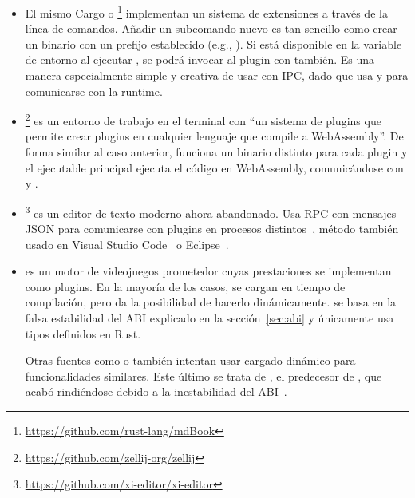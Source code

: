 \begin{itemize}
    \item El mismo Cargo o
        \footnote{\url{https://github.com/rust-lang/mdBook}}
        implementan un sistema de extensiones a través de la línea de comandos.
        Añadir un subcomando nuevo es tan sencillo como crear un binario con un
        prefijo establecido (e.g., ). Si está disponible en
        la variable de entorno  al ejecutar , se podrá
        invocar al plugin con  también. Es una manera
        especialmente simple y creativa de usar \pipes con IPC, dado que usa
        \stdin y \stdout para comunicarse con la runtime.

    \item {}\footnote{\url{https://github.com/zellij-org/zellij}} es
        un entorno de trabajo en el terminal con ``un sistema de plugins que
        permite crear plugins en cualquier lenguaje que compile a WebAssembly''.
        De forma similar al caso anterior, funciona un binario distinto para
        cada plugin y el ejecutable principal ejecuta el código en WebAssembly,
        comunicándose con \stdin y \stdout.

    \item {}\footnote{\url{https://github.com/xi-editor/xi-editor}} es un
        editor de texto moderno ahora abandonado. Usa RPC con mensajes JSON para
        comunicarse con plugins en procesos distintos~\cite{xiplugin}, método
        también usado en Visual Studio Code~\cite{vscodeplugin} o
        Eclipse~\cite{eclipseplugin}.

    \item {} es un motor de videojuegos prometedor cuyas
        prestaciones se implementan como plugins. En la mayoría de los casos, se
        cargan en tiempo de compilación, pero 
        da la posibilidad de hacerlo dinámicamente.  se basa en la
        falsa estabilidad del ABI explicado en la sección~\ref{sec:abi} y
        únicamente usa tipos definidos en Rust.

        Otras fuentes como \textcite{dynloading1} o \textcite{dynloading2}
        también intentan usar cargado dinámico para funcionalidades similares.
        Este último se trata de , el predecesor de
        , que acabó rindiéndose debido a la inestabilidad del
        ABI~\cite{dynloading_giveup1}\cite{dynloading_giveup2}.

\end{itemize}

